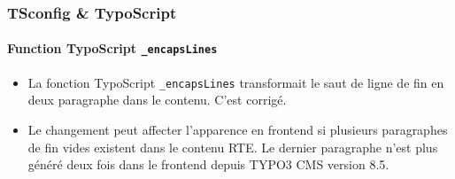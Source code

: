 \begin{frame}[fragile]
	\frametitle{TSconfig \& TypoScript}
	\framesubtitle{Function TypoScript \texttt{\_encapsLines}}

	\begin{itemize}
		\item La fonction TypoScript \texttt{\_encapsLines} transformait le
			saut de ligne de fin en deux paragraphe dans le contenu. C'est corrigé.

		\item Le changement peut affecter l'apparence en frontend si plusieurs paragraphes
			de fin vides existent dans le contenu RTE. Le dernier paragraphe n'est plus
			généré deux fois dans le frontend depuis TYPO3 CMS version 8.5.

	\end{itemize}

\end{frame}

